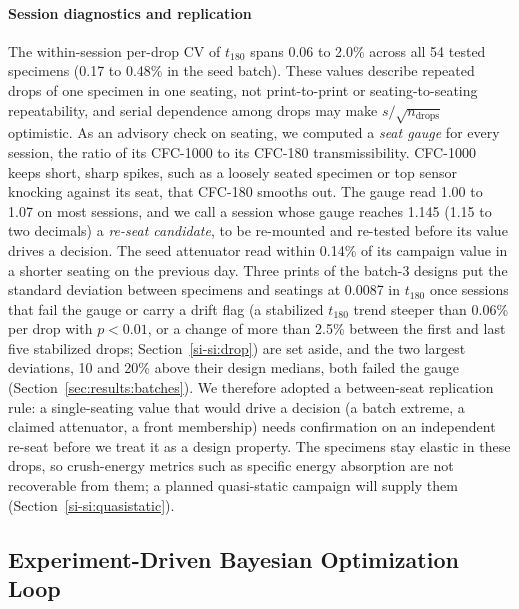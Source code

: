 \documentclass[lineno,nocopyright,upint,varvw,hyphenate]{asmejour}
\newcommand{\siref}[1]{\ref*{si-#1}}
\begin{document}
\paragraph{Session diagnostics and replication} The within-session
per-drop CV of $t_{180}$ spans 0.06 to 2.0\% across all 54 tested
specimens (0.17 to 0.48\% in the seed batch). These values describe
repeated drops of one specimen in one seating, not print-to-print or
seating-to-seating repeatability, and serial dependence among drops may
make $s/\sqrt{n_{\mathrm{drops}}}$ optimistic. As an advisory check on
seating, we computed a \emph{seat gauge} for every session, the ratio of
its CFC-1000 to its CFC-180 transmissibility. CFC-1000 keeps short,
sharp spikes, such as a loosely seated specimen or top sensor knocking
against its seat, that CFC-180 smooths out. The gauge read 1.00 to 1.07
on most sessions, and we call a session whose gauge reaches 1.145 (1.15
to two decimals) a \emph{re-seat candidate}, to be re-mounted and
re-tested before its value drives a decision. The seed attenuator read
within 0.14\% of its campaign value in a shorter seating on the
previous day. Three prints of the
batch-3 designs put the standard deviation between specimens and
seatings at 0.0087 in $t_{180}$ once sessions that fail the gauge or
carry a drift flag (a stabilized $t_{180}$ trend steeper than 0.06\% per
drop with $p < 0.01$, or a change of more than 2.5\% between the first
and last five stabilized drops; Section~\siref{si:drop}) are set aside,
and the two largest deviations, 10
and 20\% above their design medians, both failed the gauge
(Section~\ref{sec:results:batches}). We therefore adopted a
between-seat replication rule: a single-seating value that would drive a
decision (a batch extreme, a claimed attenuator, a front membership)
needs confirmation on an independent re-seat before we treat it as a
design property. The specimens stay elastic in these drops, so
crush-energy metrics such as specific energy absorption are not
recoverable from them; a planned quasi-static campaign will supply them
(Section~\siref{si:quasistatic}).

\subsection{Experiment-Driven Bayesian Optimization Loop}
\label{sec:methods:bo}
\end{document}

